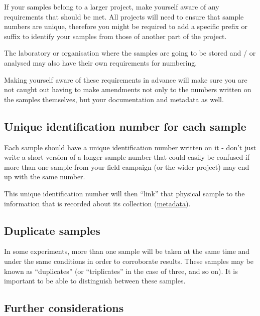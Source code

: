 \documentclass[a4paper,oneside]{report}
\begin{document}
If your samples belong to a larger project, make yourself aware of any
requirements that should be met. All projects will need to ensure that
sample numbers are unique, therefore you might be required to add a
specific prefix or suffix to identify your samples from those of another
part of the project.

The laboratory or organisation where the samples are going to be stored
and / or analysed may also have their own requirements for numbering.

Making yourself aware of these requirements in advance will make sure
you are not caught out having to make amendments not only to the numbers
written on the samples themselves, but your documentation and metadata
as well.

\hypertarget{unique-identification-number-for-each-sample}{%
\subsection{Unique identification number for each
sample}\label{unique-identification-number-for-each-sample}}

Each sample should have a unique identification number written on it -
don't just write a short version of a longer sample number that could
easily be confused if more than one sample from your field campaign (or
the wider project) may end up with the same number.

This unique identification number will then ``link'' that physical
sample to the information that is recorded about its collection
(\protect\hyperlink{recording-information-about-sample-collection-metadata}{metadata}).

\hypertarget{duplicate-samples}{%
\subsection{Duplicate samples}\label{duplicate-samples}}

In some experiments, more than one sample will be taken at the same time
and under the same conditions in order to corroborate results. These
samples may be known as ``duplicates'' (or ``triplicates'' in the case
of three, and so on). It is important to be able to distinguish between
these samples.

\hypertarget{further-considerations}{%
\subsection{Further considerations}\label{further-considerations}}
\end{document}
